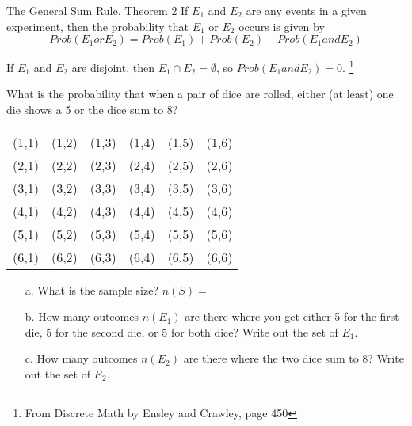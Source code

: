 {    \newpage

        \begin{intro}{The General Sum Rule, Theorem 2}
            If $E_1$ and $E_2$ are any events in a given experiment,
            then the probability that $E_1$ or $E_2$ occurs is given by
            $$ Prob(E_1 or E_2) = Prob(E_1) + Prob(E_2) - Prob(E_1 and E_2) $$

            If $E_1$ and $E_2$ are disjoint, then $E_1 \cap E_2 = \emptyset$,
            so $Prob(E_1 and E_2) = 0$.
            \footnote{From Discrete Math by Ensley and Crawley, page 450}
        \end{intro}

    \begin{questionNOGRADE}{\thequestion}
        What is the probability that when a pair of dice are rolled,
        either (at least) one die shows a 5 or the dice sum to 8?

            \begin{center}
                \footnotesize
                \begin{tabular}{c c c c c c}
                    (1,1) & (1,2) & (1,3) & (1,4) & (1,5) & (1,6) \\
                        (2,1) & (2,2) & (2,3) & (2,4) & (2,5) & (2,6) \\
                    (3,1) & (3,2) & (3,3) & (3,4) & (3,5) & (3,6) \\
                        (4,1) & (4,2) & (4,3) & (4,4) & (4,5) & (4,6) \\
                    (5,1) & (5,2) & (5,3) & (5,4) & (5,5) & (5,6) \\
                        (6,1) & (6,2) & (6,3) & (6,4) & (6,5) & (6,6)
                \end{tabular}
            \end{center}

        \begin{itemize}
            \item[a.]   What is the sample size? $n(S) = $

            \item[b.]   How many outcomes $n(E_1)$ are there where you get either 5 for the first die, 5 for the second die, or 5 for both dice? Write out the set of $E_1$.
                        ~\\ \vspace{.5cm}

            \item[c.]   How many outcomes $n(E_2)$ are there where the two dice sum to 8? Write out the set of $E_2$.
                        ~\\ \vspace{.5cm}


\end{itemize}
\end{questionNOGRADE}}

